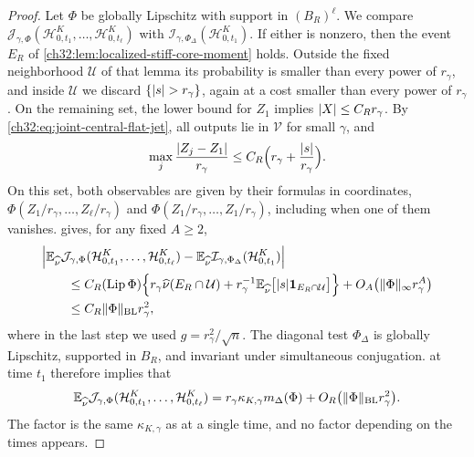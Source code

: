 \begin{proof}
Let $\Phi$ be globally Lipschitz with support in $(B_R)^\ell$. We compare $\mathcal J_{\gamma,\Phi}(\mathcal H^K_{0,t_1},\dots,\mathcal H^K_{0,t_\ell})$ with $\mathcal I_{\gamma,\Phi_\Delta}(\mathcal H^K_{0,t_1})$. If either is nonzero, then the event $E_R$ of \cref{ch32:lem:localized-stiff-core-moment} holds. Outside the fixed neighborhood $\mathcal U$ of that lemma its probability is smaller than every power of $r_\gamma$, and inside $\mathcal U$ we discard $\{\lvert s\rvert>r_\gamma\}$, again at a cost smaller than every power of $r_\gamma$. On the remaining set, the lower bound for $Z_1$ implies $\lvert X\rvert\le C_Rr_\gamma$. By \eqref{ch32:eq:joint-central-flat-jet}, all outputs lie in $\mathcal V$ for small $\gamma$, and
\[
 \max_j\frac{\lvert Z_j-Z_1\rvert}{r_\gamma}\le C_R\Bigl(r_\gamma+\frac{\lvert s\rvert}{r_\gamma}\Bigr).
\]
On this set, both observables are given by their formulas in coordinates, $\Phi(Z_1/r_\gamma,\dots,Z_\ell/r_\gamma)$ and $\Phi(Z_1/r_\gamma,\dots,Z_1/r_\gamma)$, including when one of them vanishes.  gives, for any fixed $A\ge2$,
\begin{equation}\label{ch32:eq:zero-white-diagonal-error}
 \begin{split}
 &\Bigl\lvert\mathbb E_{\widehat\nu}\mathcal J_{\gamma,\Phi}(\mathcal H^K_{0,t_1},\dots,\mathcal H^K_{0,t_\ell})-\mathbb E_{\widehat\nu}\mathcal I_{\gamma,\Phi_\Delta}(\mathcal H^K_{0,t_1})\Bigr\rvert\\
 &\qquad\le C_R(\operatorname{Lip}\Phi)\Bigl\{r_\gamma\widehat\nu(E_R\cap\mathcal U)+r_\gamma^{-1}\mathbb E_{\widehat\nu}\bigl[\lvert s\rvert\mathbf 1_{E_R\cap\mathcal U}\bigr]\Bigr\}+O_A\bigl(\lVert \Phi\rVert_\infty r_\gamma^A\bigr)\\
 &\qquad\le C_R\lVert \Phi\rVert_{\mathrm{BL}}r_\gamma^2,
 \end{split}
\end{equation}
where in the last step we used $g=r_\gamma^2/\sqrt n$. The diagonal test $\Phi_\Delta$ is globally Lipschitz, supported in $B_R$, and invariant under simultaneous conjugation.  at time $t_1$ therefore implies that
\begin{equation}\label{ch32:eq:zero-white-joint-scalar}
 \mathbb E_{\widehat\nu}\mathcal J_{\gamma,\Phi}(\mathcal H^K_{0,t_1},\dots,\mathcal H^K_{0,t_\ell})=r_\gamma\kappa_{K,\gamma}m_\Delta(\Phi)+O_R\bigl(\lVert \Phi\rVert_{\mathrm{BL}}r_\gamma^2\bigr).
\end{equation}
The factor is the same $\kappa_{K,\gamma}$ as at a single time, and no factor depending on the times appears.


\end{proof}
